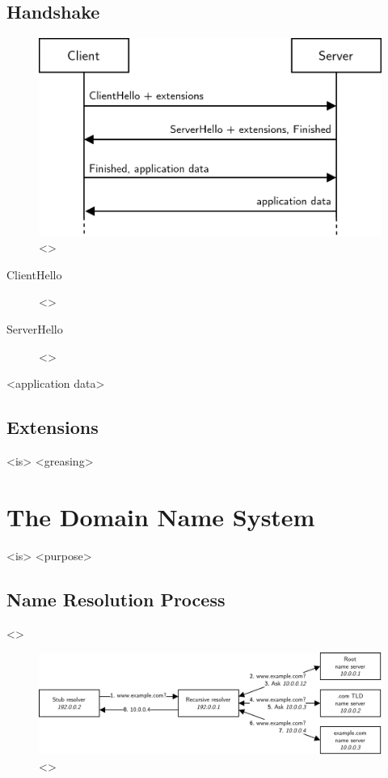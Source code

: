\subsection{Handshake}

\begin{figure}[ht]
\centerline{\includegraphics[width=160mm]{images/tls-handshake.png}}
\caption[Basic TLS 1.3 handshake]{<>}
\label{tls_handshake_figure}
\end{figure}

\begin{description}
	\item[ClientHello] <>
	\item[ServerHello] <>
\end{description}

<application data>

\subsection{Extensions}

<is>
<greasing>








\section{The Domain Name System}

<is>
<purpose>

\subsection{Name Resolution Process}

<>

\begin{figure}[ht]
\centerline{\includegraphics[width=160mm]{images/dns-resolve.png}}
\caption[Example DNS name resolution process]{<>}
\label{dns_resolve_figure}
\end{figure}

